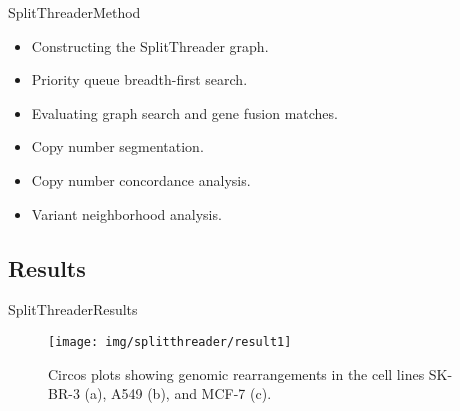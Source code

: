 \documentclass[10pt]{beamer}
\newcommand{\1}{
        	\setbeamertemplate{background}{
        		\texttt{[image: img/1\_BIO]}
        		\tikz[overlay] \fill[fill opacity=0.75,fill=white] (0,0) rectangle (-\paperwidth,\paperheight);
        	}
}
\begin{document}
\begin{frame}{SplitThreader}{Method}	
	\begin{itemize}{}
		\item Constructing the SplitThreader graph.
		\item Priority queue breadth-first search.
		\item Evaluating graph search and gene fusion matches.
		\item Copy number segmentation.
		\item Copy number concordance analysis.
		\item Variant neighborhood analysis.		
	\end{itemize}	
\end{frame}



\subsection{Results}

\begin{frame}{SplitThreader}{Results}	
	\begin{figure}
		\centering
		\texttt{[image: img/splitthreader/result1]}
		\caption{ Circos plots showing genomic rearrangements in the cell lines SK-BR-3 (a), A549 (b), and MCF-7 (c).}
	\end{figure}
\end{frame}
\end{document}
